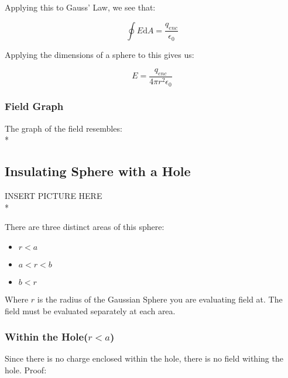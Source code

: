 \documentclass[a4paper,12pt]{article}
\begin{document}
								Applying this to Gauss' Law, we see that:

								\begin{equation*}
										\oint E \mathrm{d}A = \frac{q_{enc}}{\epsilon_{0}}
								\end{equation*}

								Applying the dimensions of a sphere to this gives us:

								\begin{equation*}
										E = \frac{q_{enc}}{4 \pi r^{2} \epsilon_{0}}
								\end{equation*}
						\subsubsection{Field Graph}
								The graph of the field resembles:\\*

				\subsection{Insulating Sphere with a Hole}
					INSERT PICTURE HERE\\*

					There are three distinct areas of this sphere:
					\begin{itemize}
							\item $r < a$
							\item $a < r < b$
							\item $b < r$
					\end{itemize}

					Where $r$ is the radius of the Gaussian Sphere you are evaluating field at. The field must be evaluated separately at each area.
					\subsubsection{Within the Hole($r < a$)}
						Since there is no charge enclosed within the hole, there is no field withing the hole. Proof:
\end{document}
